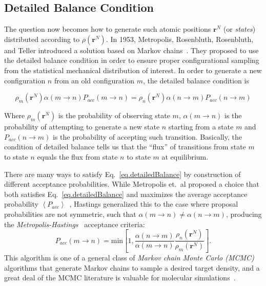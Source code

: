 \documentclass[aip,jcp,preprint,superscriptaddress,floatfix]{revtex4-1}
\begin{document}
\subsection{Detailed Balance Condition}

The question now becomes how to generate such atomic positions $\textbf{r}^N$
(or \textit{states}) distributed
according to $\rho\left(\textbf{r}^N\right)$. In 1953, Metropolis, Rosenbluth, Rosenbluth, and Teller introduced a
solution based on Markov chains~\cite{Metropolis.JCP.21.1087.1953}. 
They proposed to use the detailed balance
condition in order to ensure proper configurational sampling from
the statistical mechanical distribution of interest. In order to generate
a new configuration $n$ from an old configuration $m$,
the detailed balance condition is

\begin{equation}
	\rho_m\left(\textbf{r}^N\right) \alpha \left(m \rightarrow n \right)
	P_{acc} \left(m \rightarrow n \right) =
	\rho_n\left(\textbf{r}^N\right) \alpha \left(n \rightarrow m \right)
	P_{acc} \left(n \rightarrow m \right) 
	   \label{eq.detailedBalance}
\end{equation}

Where $\rho_m\left(\textbf{r}^N\right)$ is the probability of observing
state $m$,
$\alpha \left(m \rightarrow n \right)$ is the probability of
attempting to generate a new state $n$ starting from a state $m$  and 
$P_{acc} \left(n \rightarrow m \right)$ is the probability of accepting 
such transition. Basically, the condition of detailed balance tells us that the
``flux'' of transitions
from state $m$ to state $n$ equals the flux from state $n$ to state $m$ at
equilibrium.

There are many ways to satisfy Eq.~\ref{eq.detailedBalance} by construction of different acceptance probabilities. 
While Metropolis et.~al proposed a choice that both satisfies Eq.~\ref{eq.detailedBalance} and maximizes the average acceptance probability $\left< P_{acc} \right>$~\cite{Metropolis.JCP.21.1087.1953}, Hastings generalized this to the case where proposal probabilities are not symmetric, such that $\alpha \left(m \rightarrow n \right) \ne \alpha \left(n \rightarrow m \right)$, producing the \emph{Metropolis-Hastings}~\cite{Hastings.Biometrika.57.97.1970} acceptance criteria:
\begin{equation}
	P_{acc}(m \rightarrow n) = \text{min} \left[1,\frac{\alpha \left(n
		\rightarrow m \right)}{\alpha \left(m \rightarrow n \right)}
		\frac{\rho_n\left(\textbf{r}^N\right)}{\rho_m\left(\textbf{r}^N\right)}
	\right]
	\label{eq.MetropolisHastings} .
\end{equation}
This algorithm is one of a general class of \emph{Markov chain Monte Carlo (MCMC)} algorithms that generate Markov chains to sample a desired target density, and a great deal of the MCMC literature is valuable for molecular simulations~\cite{Liu.Book}.
\end{document}

